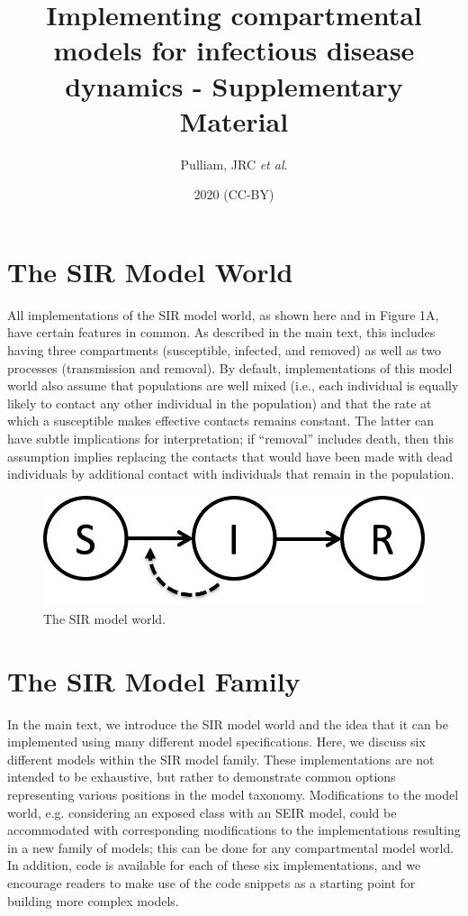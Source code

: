 \documentclass[margin,line,11pt]{article}
\title{Implementing compartmental models for infectious disease dynamics - Supplementary Material}
\author{Pulliam, JRC {\em et al}.}
\date{2020 (CC-BY)}
\begin{document}

\maketitle


\section{The SIR Model World}

All implementations of the SIR model world, as shown here and in Figure 1A, have certain features in common. 
As described in the main text, this includes having three compartments (susceptible, infected, and removed) as well as two processes (transmission and removal). 
By default, implementations of this model world also assume that  populations are well mixed (i.e., each individual is equally likely to contact any other individual in the population) and that the rate at which a susceptible makes effective contacts remains constant. The latter can have subtle implications for interpretation; if ``removal'' includes death, then this assumption implies replacing the contacts that would have been made with dead individuals by additional contact with individuals that remain in the population.

\begin{figure}[h]
    \centering
    \includegraphics{SIR.png}
    \caption{The SIR model world.}
    \label{fig:my_label}
\end{figure}

\section{The SIR Model Family}

In the main text, we introduce the SIR model world and the idea that it can be implemented using many different model specifications. 
Here, we discuss six different models within the SIR model family. 
These implementations are not intended to be exhaustive, but rather to demonstrate common options representing various positions in the model taxonomy. 
Modifications to the model world, e.g. considering an exposed class with an SEIR model, could be accommodated with corresponding modifications to the implementations resulting in a new family of models; this can be done for any compartmental model world.
In addition, code is available for each of these six implementations, and we encourage readers to make use of the code snippets as a starting point for building more complex models.
\end{document}
